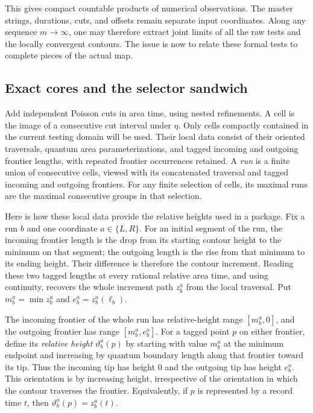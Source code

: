 This gives compact countable products of numerical observations.  The
master strings, durations, cuts, and offsets remain separate input
coordinates.  Along any sequence $m\to\infty$, one may therefore
extract joint limits of all the raw tests and the locally convergent
contours.  The issue is now to relate these formal tests to complete
pieces of the actual map.

\subsection{Exact cores and the selector sandwich}

Add independent Poisson cuts in area time, using nested refinements.
A cell is the image of a consecutive cut interval under $\eta$.
Only cells compactly contained in the current testing domain will be
used.  Their local data consist of their oriented traversals, quantum
area parameterizations, and tagged incoming and outgoing frontier
lengths, with repeated frontier occurrences retained.
A \emph{run} is a finite union of consecutive cells, viewed with its
concatenated traversal and tagged incoming and outgoing frontiers.
For any finite selection of cells, its maximal runs are the maximal
consecutive groups in that selection.

Here is how these local data provide the relative heights used in a
package.  Fix a run $b$ and one coordinate $a\in\{L,R\}$.  For an
initial segment of the run, the incoming frontier length is the drop
from its starting contour height to the minimum on that segment;
the outgoing length is the rise from that minimum to its ending
height.  Their difference is therefore the contour increment.
Reading these two tagged lengths at every rational relative area
time, and using continuity, recovers the whole increment path
$z_b^a$ from the local traversal.  Put
$m_b^a=\min z_b^a$ and $e_b^a=z_b^a(\ell_b)$.

The incoming frontier of the whole run has relative-height range
$[m_b^a,0]$, and the outgoing frontier has range $[m_b^a,e_b^a]$.
For a tagged point $p$ on either frontier, define its
\emph{relative height} $\vartheta_b^a(p)$ by starting with value
$m_b^a$ at the minimum endpoint and increasing by quantum boundary
length along that frontier toward its tip.  Thus the incoming tip
has height $0$ and the outgoing tip has height $e_b^a$.
This orientation is by increasing height, irrespective of the
orientation in which the contour traverses the frontier.  Equivalently,
if $p$ is represented by a record time $t$, then
$\vartheta_b^a(p)=z_b^a(t)$.

